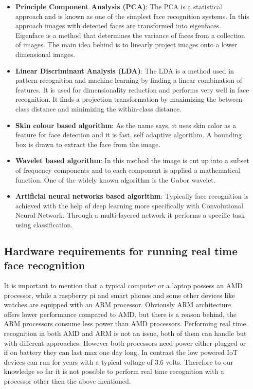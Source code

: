 \begin{itemize}
    \item \textbf{Principle Component Analysis (PCA)}: The PCA is a statistical approach and is known as one of the simplest face recognition systems. In this approach images with detected faces are transformed into eigenfaces. Eigenface is a method that determines the variance of faces from a collection of images. The main idea behind is to linearly project images onto a lower dimensional images. 
    
    
    \item \textbf{Linear Discriminant Analysis (LDA)}: The LDA is a method used in pattern recognition and machine learning by finding a linear combination of features. It is used for dimensionality reduction and performs very well in face recognition. It finds a projection transformation by maximizing the between-class distance and minimizing the within-class distance. 
   
   
   
    \item \textbf{Skin colour based algorithm}:
    As the name says, it uses skin color as a feature for face detection and it is fast, self adaptive algorithm. A bounding box is drawn to extract the face from the image.
    
    
    \item \textbf{Wavelet based algorithm}:
    In this method the image is cut up into a subset of frequency components and to each component is applied a mathematical function. One of the widely known algorithm is the Gabor wavelet.
    \item \textbf{Artificial  neural  networks  based  algorithm}: 
    Typically face recognition is achieved with the help of deep learning more specifically with Convolutional Neural Network. Through a multi-layered network it performs a specific task using classification.
\end{itemize}


\subsection{Hardware requirements for running real time face recognition}

It is important to mention that a typical computer or a laptop possess an AMD processor, while a raspberry pi and smart phones and some other devices like watches are equipped with an ARM processor. Obviously ARM architecture offers lower performance compared to AMD, but there is a reason behind, the ARM processors consume less power than AMD processors. Performing real time recognition in both AMD and ARM is not an issue, both of them can handle but with different approaches. However both processors need power either plugged or if on battery they can last max one day long. In contrast the low powered IoT devices can run for years with a typical voltage of 3.6 volts. Therefore to our knowledge so far it is not possible to perform real time recognition with a processor other then the above mentioned. 


